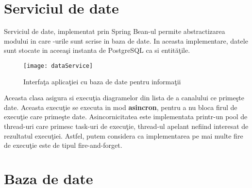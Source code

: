 \section{Serviciul de date}
Serviciul de date, implementat prin Spring Bean-ul  permite abstractizarea modului in care -urile sunt scrise in baza de date. In aceasta implementare, datele sunt stocate in aceeaşi instanta de PostgreSQL ca si entităţile.
\begin{figure}[H]
	\centering
	\texttt{[image: dataService]}
	\caption{Interfaţa aplicaţiei cu baza de date pentru informaţii}
	\label{fig:dataService}
\end{figure}
Aceasta clasa asigura si execuţia diagramelor din lista de  a canalului ce primeşte date. Aceasta execuţie se executa in mod \textbf{asincron}, pentru a nu bloca firul de execuţie care primeşte date. Asincornicitatea este implementata printr-un pool de thread-uri care primesc task-uri de execuţie, thread-ul apelant nefiind interesat de rezultatul execuţiei. Astfel, putem considera ca implementarea pe mai multe fire de execuţie este de tipul fire-and-forget.
\section{Baza de date}